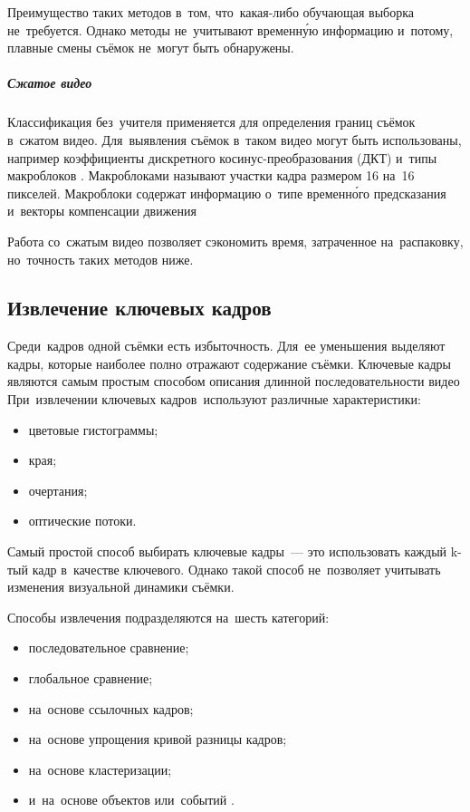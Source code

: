 Преимущество таких методов в~том, что~какая-либо
обучающая выборка не~требуется.
Однако методы не~учитывают временну́ю информацию
и~потому, плавные смены съёмок не~могут быть обнаружены.


\subparagraph{Сжатое видео}

Классификация без~учителя применяется для
определения границ съёмок в~сжатом видео.
Для~выявления съёмок в~таком видео могут быть использованы,
например коэффициенты дискретного косинус-преобразования
(ДКТ) и~типы макроблоков
\cite{Zhao:2006} \cite{Bruyne:2008} \cite{Koumaras:2006}.
Макроблоками называют участки кадра размером 16 на~16
пикселей. Макроблоки содержат информацию о~типе временно́го
предсказания и~векторы компенсации движения \cite{Gall:1991}

Работа со~сжатым видео позволяет сэкономить
время, затраченное на~распаковку,
но~точность таких методов ниже.


\subsection{Извлечение ключевых кадров}

Среди~кадров одной съёмки есть избыточность.
Для~ее уменьшения выделяют кадры,
которые наиболее полно отражают содержание съёмки.
Ключевые кадры являются самым простым способом описания
длинной последовательности видео
При~извлечении ключевых кадров\
используют различные характеристики:
\begin{itemize}
    \item цветовые гистограммы;
    \item края;
    \item очертания;
    \item оптические потоки.
\end{itemize}

Самый простой способ выбирать ключевые кадры~— это использовать каждый
k-тый кадр в~качестве ключевого. Однако такой способ не~позволяет
учитывать изменения визуальной динамики съёмки.

Способы извлечения подразделяются на~шесть категорий:
\begin{itemize}
    \item последовательное сравнение;
    \item глобальное сравнение;
    \item на~основе ссылочных кадров;
    \item на~основе упрощения кривой разницы кадров;
    \item на~основе кластеризации;
    \item и~на~основе объектов или~событий \cite{Truong:2007}.
\end{itemize}

